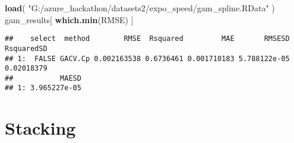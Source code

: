 \documentclass[]{article}
\newenvironment{Shaded}{\begin{snugshade}}{\end{snugshade}}
\newcommand{\KeywordTok}[1]{\textcolor[rgb]{0.13,0.29,0.53}{\textbf{#1}}}
\newcommand{\NormalTok}[1]{#1}
\newcommand{\StringTok}[1]{\textcolor[rgb]{0.31,0.60,0.02}{#1}}
\begin{document}
\begin{Shaded}
\begin{Highlighting}[]
\KeywordTok{load}\NormalTok{( }\StringTok{"G:/azure_hackathon/datasets2/expo_speed/gam_spline.RData"}\NormalTok{ )}
\NormalTok{gam_results[ }\KeywordTok{which.min}\NormalTok{(RMSE) ]}
\end{Highlighting}
\end{Shaded}

\begin{verbatim}
##    select  method        RMSE  Rsquared         MAE       RMSESD RsquaredSD
## 1:  FALSE GACV.Cp 0.002163538 0.6736461 0.001710183 5.788122e-05 0.02018379
##           MAESD
## 1: 3.965227e-05
\end{verbatim}

\hypertarget{stacking}{%
\section{Stacking}\label{stacking}}
\end{document}
